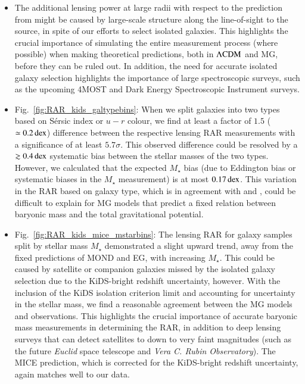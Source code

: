 \documentclass{aa}
\newcommand{\dex}{\,{\rm dex}}
\newcommand{\lcdm}{{\rm \Lambda CDM}}
\begin{document}
\begin{itemize}
	\item The additional lensing power at large radii with respect to the prediction from \citet[][see Appendix~\ref{app:Results_N17}]{navarro2017} might be caused by large-scale structure along the line-of-sight to the source, in spite of our efforts to select isolated galaxies. This highlights the crucial importance of simulating the entire measurement process (where possible) when making theoretical predictions, both in $\lcdm$ and MG, before they can be ruled out. In addition, the need for accurate isolated galaxy selection highlights the importance of large spectroscopic surveys, such as the upcoming 4MOST  \cite[]{Rdejong2019} and Dark Energy Spectroscopic Instrument \cite[DESI;][]{ruizmacias2020} surveys.
	
	\item Fig.~\ref{fig:RAR_kids_galtypebins}: When we split galaxies into two types based on S\'ersic index or $u-r$ colour, we find at least a factor of $1.5$ ($\simeq0.2 \dex$) difference between the respective lensing RAR measurements with a significance of at least $5.7 \sigma$. This observed difference could be resolved by a $\gtrsim 0.4 \dex$ systematic bias between the stellar masses of the two types. However, we calculated that the expected $M_\star$ bias (due to Eddington bias or systematic biases in the $M_\star$ measurement) is at most $0.17 \dex$. This variation in the RAR based on galaxy type, which is in agreement with \cite{taylor2020} and \cite{correa2020}, could be difficult to explain for MG models that predict a fixed relation between baryonic mass and the total gravitational potential.
	
	\item Fig.~\ref{fig:RAR_kids_mice_mstarbins}: The lensing RAR for galaxy samples split by stellar mass $M_\star$ demonstrated a slight upward trend, away from the fixed predictions of MOND and EG, with increasing $M_\star$. This could be caused by satellite or companion galaxies missed by the isolated galaxy selection due to the KiDS-bright redshift uncertainty, however. With the inclusion of the KiDS isolation criterion limit and accounting for uncertainty in the stellar mass, we find a reasonable agreement between the MG models and observations. This highlights the crucial importance of accurate baryonic mass measurements in determining the RAR, in addition to deep lensing surveys that can detect satellites to down to very faint magnitudes (such as the future \emph{Euclid} space telescope and \emph{Vera C. Rubin Observatory}). The MICE prediction, which is corrected for the KiDS-bright redshift uncertainty, again matches well to our data.
	

\end{itemize}
\end{document}
